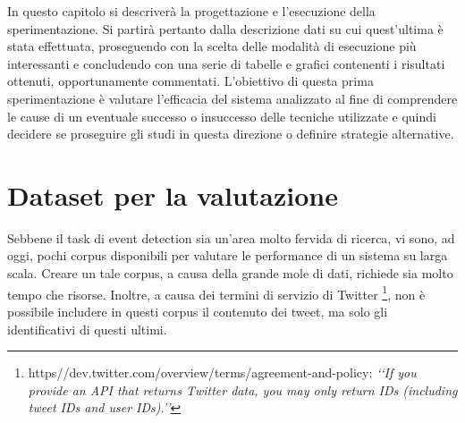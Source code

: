 



In questo capitolo si descriverà la progettazione e l'esecuzione della sperimentazione. Si partirà pertanto dalla descrizione dati su cui quest'ultima è stata effettuata, proseguendo con la scelta delle modalità di esecuzione più interessanti e concludendo con una serie di tabelle e grafici contenenti i risultati ottenuti, opportunamente commentati.  
L'obiettivo di questa prima sperimentazione è valutare l'efficacia del sistema analizzato al fine di comprendere le cause di un eventuale successo o insuccesso delle tecniche utilizzate e quindi decidere se proseguire gli studi in questa direzione o definire strategie alternative.
\section{Dataset per la valutazione}


Sebbene il task di event detection sia un'area molto fervida di ricerca, vi sono, ad oggi, pochi corpus disponibili per valutare le performance di un sistema su larga scala. Creare un tale corpus, a causa della grande mole di dati, richiede sia molto tempo che risorse. Inoltre, a causa dei termini di servizio di Twitter
\footnote{https//dev.twitter.com/overview/terms/agreement-and-policy: \emph{\lq\lq If you provide an API that returns Twitter data, you may only return IDs (including tweet IDs and user IDs).\rq\rq}},
 non è possibile includere in questi corpus il contenuto dei tweet, ma solo gli identificativi di questi ultimi.

